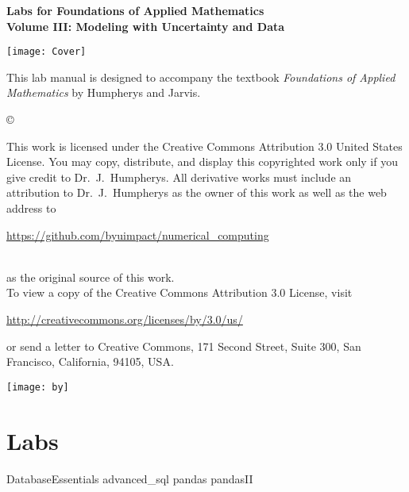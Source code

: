 \documentclass[nociteref]{SIAM-GH-book}
\begin{document}
\thispagestyle{empty}
\begin{center}
{\huge \bf Labs for Foundations of Applied Mathematics} \\
\vspace{5mm}
{\Large \bf Volume III: Modeling with
Uncertainty and Data}
\vspace{20mm}

\texttt{[image: Cover]}
\end{center}
\frontmatter




\begin{thepreface}
This lab manual is designed to accompany the textbook \emph{Foundations of Applied Mathematics} by Humpherys and Jarvis.

\vfill
\copyright{This work is licensed under the Creative Commons Attribution 3.0 United States
License.  You may copy, distribute, and display this copyrighted work only if you give
credit to Dr.~J.~Humpherys. All derivative works must include an attribution to Dr.~J.~Humpherys as the owner of this work as well as the web address to
\\\centerline{\url{https://github.com/byuimpact/numerical_computing}}\\ as the original source of
this
work.\\To view a copy of the Creative Commons Attribution 3.0 License,
visit\\\centerline{\url{http://creativecommons.org/licenses/by/3.0/us/}} or send a letter to
Creative Commons, 171 Second Street, Suite 300, San Francisco, California, 94105, USA.}

\vfill
\centering\texttt{[image: by]}
\vfill
\end{thepreface}

\setcounter{tocdepth}{1}
\tableofcontents

\mainmatter

\part{Labs}
{DatabaseEssentials}
{advanced_sql}
{pandas}
{pandasII}
\end{document}
